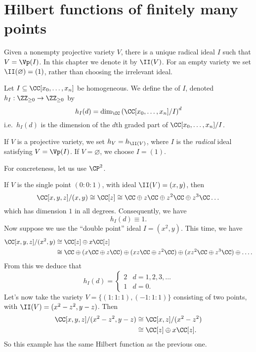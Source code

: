 \section{Hilbert functions of finitely many points}
\begin{definition}
	Given a nonempty projective variety $V$, there is a unique
	radical ideal $I$ such that $V = \Vp(I)$.
	In this chapter we denote it by $\II(V)$.
	For an empty variety we set $\II(\varnothing) = (1)$,
	rather than choosing the irrelevant ideal.
\end{definition}
\begin{definition}
	Let $I \subseteq \CC[x_0, \dots, x_n]$ be homogeneous.
	We define the  of $I$,
	denoted $h_I : \ZZ_{\ge 0} \to \ZZ_{\ge 0}$ by
	\[ h_I(d) = \dim_{\CC} \left( \CC[x_0, \dots, x_n]/I \right)^d \]
	i.e.\ $h_I(d)$ is the dimension of the $d$th graded part of
	$\CC[x_0, \dots, x_n] / I$.
\end{definition}
\begin{definition}
	If $V$ is a projective variety, we set $h_V = h_{\II(V)}$,
	where $I$ is the \emph{radical} ideal satisfying $V = \Vp(I)$.
	If $V = \varnothing$, we choose $I = (1)$.
\end{definition}
\begin{example}
	\label{ex:hilbert_zero}
	For concreteness, let us use $\CP^2$.
	\begin{enumerate}[(a)]
		\ii If $V$ is the single point $(0:0:1)$,
		with ideal $\II(V) = (x,y)$,
		then
		\[ \CC[x,y,z] / (x,y) \cong \CC[z]
		\cong \CC \oplus z\CC \oplus z^2\CC \oplus z^3\CC \dots \]
		which has dimension $1$ in all degrees.
		Consequently, we have \[ h_I(d) \equiv 1. \]
		\ii Now suppose we use the ``double point'' ideal $I = (x^2,y)$.
		This time, we have
		\begin{align*}
			\CC[x,y,z] / (x^2,y)
			&\cong \CC[z] \oplus x\CC[z] \\
			&\cong \CC \oplus (x\CC \oplus z\CC) \oplus (xz\CC \oplus z^2\CC)
			\oplus (xz^2\CC \oplus z^3\CC) \oplus\dots.
		\end{align*}
		From this we deduce that
		\[
			h_I(d) =
			\begin{cases}
				2 & d = 1, 2, 3, \dots \\
				1 & d = 0.
			\end{cases}
		\]
		\ii Let's now take the variety $V = \{(1:1:1), (-1:1:1)\}$
		consisting of two points, with $\II(V) = (x^2-z^2, y-z)$. Then
		\begin{align*}
			\CC[x,y,z] / (x^2-z^2,y-z)
			&\cong \CC[x,z] / (x^2-z^2) \\
			&\cong \CC[z] \oplus x\CC[z].
		\end{align*}
		So this example has the same Hilbert function as the previous one.
	\end{enumerate}
\end{example}
